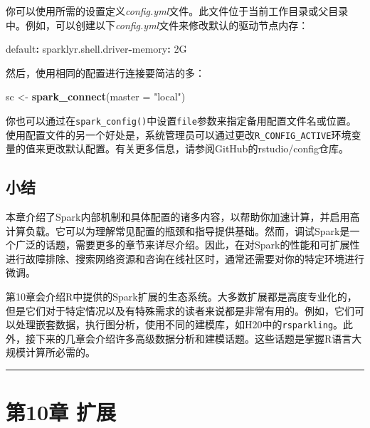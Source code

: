 \documentclass[
]{article}
\newenvironment{Shaded}{\begin{snugshade}}{\end{snugshade}}
\newcommand{\DataTypeTok}[1]{\textcolor[rgb]{0.13,0.29,0.53}{#1}}
\newcommand{\KeywordTok}[1]{\textcolor[rgb]{0.13,0.29,0.53}{\textbf{#1}}}
\newcommand{\NormalTok}[1]{#1}
\newcommand{\OperatorTok}[1]{\textcolor[rgb]{0.81,0.36,0.00}{\textbf{#1}}}
\newcommand{\StringTok}[1]{\textcolor[rgb]{0.31,0.60,0.02}{#1}}
\begin{document}
你可以使用所需的设置定义\emph{config.yml}文件。此文件位于当前工作目录或父目录中。例如，可以创建以下\emph{config.yml}文件来修改默认的驱动节点内存：

\begin{Shaded}
\begin{Highlighting}[]
\NormalTok{default}\OperatorTok{:}
\NormalTok{sparklyr.shell.driver}\OperatorTok{-}\NormalTok{memory}\OperatorTok{:}\StringTok{ }\NormalTok{2G}
\end{Highlighting}
\end{Shaded}

然后，使用相同的配置进行连接要简洁的多：

\begin{Shaded}
\begin{Highlighting}[]
\NormalTok{sc <-}\StringTok{ }\KeywordTok{spark_connect}\NormalTok{(}\DataTypeTok{master =} \StringTok{"local"}\NormalTok{)}
\end{Highlighting}
\end{Shaded}

你也可以通过在\texttt{spark\_config()}中设置\texttt{file}参数来指定备用配置文件名或位置。使用配置文件的另一个好处是，系统管理员可以通过更改\texttt{R\_CONFIG\_ACTIVE}环境变量的值来更改默认配置。有关更多信息，请参阅GitHub的rstudio/config仓库。

\hypertarget{ux5c0fux7ed3-7}{%
\subsection{小结}\label{ux5c0fux7ed3-7}}

本章介绍了Spark内部机制和具体配置的诸多内容，以帮助你加速计算，并启用高计算负载。它可以为理解常见配置的瓶颈和指导提供基础。然而，调试Spark是一个广泛的话题，需要更多的章节来详尽介绍。因此，在对Spark的性能和可扩展性进行故障排除、搜索网络资源和咨询在线社区时，通常还需要对你的特定环境进行微调。

第10章会介绍R中提供的Spark扩展的生态系统。大多数扩展都是高度专业化的，但是它们对于特定情况以及有特殊需求的读者来说都是非常有用的。例如，它们可以处理嵌套数据，执行图分析，使用不同的建模库，如H20中的\texttt{rsparkling}。此外，接下来的几章会介绍许多高级数据分析和建模话题。这些话题是掌握R语言大规模计算所必需的。

\begin{center}\rule{0.5\linewidth}{\linethickness}\end{center}

\hypertarget{ux7b2c10ux7ae0-ux6269ux5c55}{%
\section{第10章 扩展}\label{ux7b2c10ux7ae0-ux6269ux5c55}}
\end{document}
